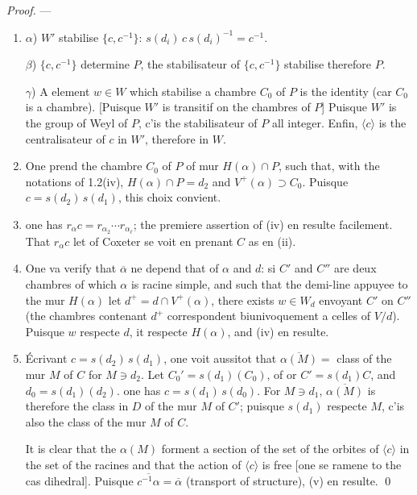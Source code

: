 \documentclass[11pt,a4paper]{article}
\theoremstyle{plain}
\theoremstyle{definition}
\begin{document}
\noindent
\textit{Proof.} --- \leavevmode
\begin{enumerate}[label=(\roman*)]
\item $\alpha$) $W'$ stabilise $\{c, c^{-1}\}$: $s(d_i)\, c\, s(d_i)^{-1} = c^{-1}$.

$\beta$) $\{c, c^{-1}\}$ determine $P$, the stabilisateur of $\{c, c^{-1}\}$ stabilise therefore $P$.

$\gamma$) A element $w \in W$ which stabilise a chambre $C_0$ of $P$ is the identity (car $C_0$ is a chambre). [Puisque $W'$ is transitif on the chambres of $P$] Puisque $W'$ is the group of Weyl of $P$, c'is the stabilisateur of $P$ all integer. Enfin, $\langle c \rangle$ is the centralisateur of $c$ in $W'$, therefore in $W$.

\item One prend the chambre $C_0$ of $P$ of mur $H(\alpha) \cap P$, such that, with the notations of 1.2(iv), $H(\alpha) \cap P = d_2$ and $V^{+}(\alpha) \supset C_0$. Puisque $c = s(d_2)\, s(d_1)$, this choix convient.

\item one has $r_\alpha c = r_{\alpha_2} \cdots r_{\alpha_\ell}$; the premiere assertion of (iv) en resulte facilement. That $r_\alpha c$ let of Coxeter se voit en prenant $C$ as en (ii).

\item One va verify that $\overline{\alpha}$ ne depend that of $\alpha$ and $d$: si $C'$ and $C''$ are deux chambres of which $\alpha$ is racine simple, and such that the demi-line appuyee to the mur $H(\alpha)$ let $d^{+} = d \cap V^{+}(\alpha)$, there exists $w \in W_d$ envoyant $C'$ on $C''$ (the chambres contenant $d^{+}$ correspondent biunivoquement a celles of $V/d$). Puisque $w$ respecte $d$, it respecte $H(\alpha)$, and (iv) en resulte.

\item \setcounter{enumi}{5} \'Ecrivant $c = s(d_2)\, s(d_1)$, one voit aussitot that $\overline{\alpha(M)} =$ class of the mur $M$ of $C$ for $M \ni d_2$. Let $C_0' = s(d_1)(C_0)$, of or $C' = s(d_1) C$, and $d_0 = s(d_1)(d_2)$. one has $c = s(d_1)\, s(d_0)$. For $M \ni d_1$, $\overline{\alpha(M)}$ is therefore the class in $D$ of the mur $M$ of $C'$; puisque $s(d_1)$ respecte $M$, c'is also the class of the mur $M$ of $C$.

It is clear that the $\alpha(M)$ forment a section of the set of the orbites of $\langle c \rangle$ in the set of the racines and that the action of $\langle c \rangle$ is free [one se ramene to the cas dihedral]. Puisque $\overline{c^{-1}\alpha} = \overline{\alpha}$ (transport of structure), (v) en resulte. \qed
\end{enumerate}
\end{document}
